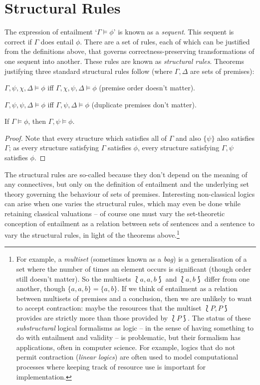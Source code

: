 \section{Structural Rules}\label{twostruct}

The expression of entailment ‘$\Gamma \vDash \phi$’ is known as a \emph{sequent}. This sequent is correct if $\Gamma$ does entail $\phi$. There are a set of rules, each of which can be justified from the definitions above, that governs correctness-preserving transformations of one sequent into another. These rules are known as \emph{structural rules}. Theorems justifying three standard structural rules follow (where $\Gamma, \Delta$ are sets of premises): \begin{theorem}[Permutation] $\Gamma, \psi,\chi,\Delta \vDash \phi$ iff $\Gamma, \chi,\psi,\Delta \vDash \phi$ (premise order doesn't matter).\end{theorem}
\begin{theorem}[Contraction]$\Gamma, \psi,\psi, \Delta \vDash \phi$ iff $\Gamma, \psi,\Delta \vDash \phi$ (duplicate premises don't matter).
\end{theorem}
\begin{theorem}
	[Weakening] If $\Gamma \vDash \phi$, then $\Gamma, \psi \vDash	\phi$.
	\begin{proof}
		Note that every structure which satisfies all of $\Gamma$ and also $\{\psi\}$ also satisfies $\Gamma$; as every structure satisfying $\Gamma$ satisfies $\phi$, every structure satisfying $\Gamma, \psi$ satisfies $\phi$.
	\end{proof}
\end{theorem}
The structural rules are so-called because they don't depend on the meaning of any connectives, but only on the definition of entailment and the underlying set theory governing the behaviour of sets of premises. Interesting non-classical logics can arise when one varies the structural rules, which may even be done while retaining classical valuations \citep{restsub} – of course one must vary the set-theoretic conception of entailment as a relation between sets of sentences and a sentence to vary the structural rules, in light of the theorems above.\footnote{For example, a \emph{multiset} (sometimes known as a \emph{bag}) is a generalisation of a set where the number of times an element occurs is significant (though order still doesn't matter). So the multisets $⟅a,a,b⟆$ and $⟅a,b⟆$ differ from one another, though $\{a,a,b\}=\{a,b\}$. If we think of entailment as a relation between multisets of premises and a conclusion, then we are unlikely to want to accept contraction: maybe the resources that the multiset $⟅P,P⟆$ provides are strictly more than those provided by $⟅P⟆$. The status of these \emph{substructural} logical formalisms as logic – in the sense of having something to do with entailment and validity – is problematic, but their formalism has applications, often in computer science. For example, logics that do not permit contraction (\emph{linear logics}) are often used to model computational processes where keeping track of resource use is important for implementation.}


